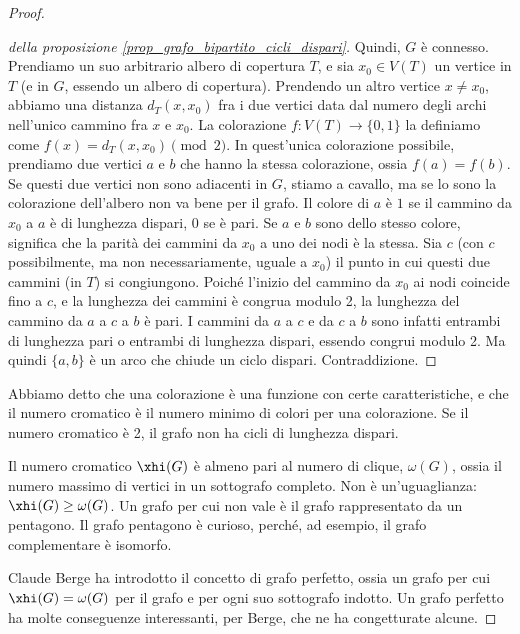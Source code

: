 \begin{proof}
\begin{proof}[della proposizione \ref{prop_grafo_bipartito_cicli_dispari}]
		Quindi, $G$ \`e connesso.
		Prendiamo un suo arbitrario albero di copertura $T$, e sia $x_0 \in V(T)$ un vertice in $T$ (e in $G$, essendo un albero di copertura).
		Prendendo un altro vertice $x \neq x_0$, abbiamo una distanza $d_T(x,x_0)$ fra i due vertici data dal numero degli archi nell'unico cammino fra $x$ e $x_0$.
		La colorazione $f : V(T) \to \{ 0, 1 \}$ la definiamo come $f(x) = d_T(x, x_0) \pmod{2}$.
		In quest'unica colorazione possibile, prendiamo due vertici $a$ e $b$ che hanno la stessa colorazione, ossia $f(a) = f(b)$.
		Se questi due vertici non sono adiacenti in $G$, stiamo a cavallo, ma se lo sono la colorazione dell'albero non va bene per il grafo.
		Il colore di $a$ \`e $1$ se il cammino da $x_0$ a $a$ \`e di lunghezza dispari, $0$ se \`e pari.
		Se $a$ e $b$ sono dello stesso colore, significa che la parit\`a dei cammini da $x_0$ a uno dei nodi \`e la stessa.
		Sia $c$ (con $c$ possibilmente, ma non necessariamente, uguale a $x_0$) il punto in cui questi due cammini (in $T$) si congiungono.
		Poich\'e l'inizio del cammino da $x_0$ ai nodi coincide fino a $c$, e la lunghezza dei cammini \`e congrua modulo 2, la lunghezza del cammino da $a$ a $c$ a $b$ \`e pari.
		I cammini da $a$ a $c$ e da $c$ a $b$ sono infatti entrambi di lunghezza pari o entrambi di lunghezza dispari, essendo congrui modulo 2.
		Ma quindi $\{a,b\}$ \`e un arco che chiude un ciclo dispari.
		Contraddizione.

	\end{proof}

	Abbiamo detto che una colorazione \`e una funzione con certe caratteristiche, e che il numero cromatico \`e il numero minimo di colori per una colorazione.
	Se il numero cromatico \`e 2, il grafo non ha cicli di lunghezza dispari.

	Il numero cromatico $\xhi(G)$ \`e almeno pari al numero di clique, $\omega(G)$, ossia il numero massimo di vertici in un sottografo completo.
	Non \`e un'uguaglianza: $\xhi(G) \ge \omega(G)$.
	Un grafo per cui non vale \`e il grafo rappresentato da un pentagono.
	Il grafo pentagono \`e curioso, perch\'e, ad esempio, il grafo complementare \`e isomorfo.


	Claude Berge ha introdotto il concetto di grafo perfetto, ossia un grafo per cui $\xhi(G) = \omega(G)$ per il grafo e per ogni suo sottografo indotto.
	Un grafo perfetto ha molte conseguenze interessanti, per Berge, che ne ha congetturate alcune.


\end{proof}
